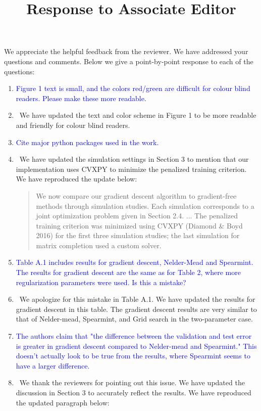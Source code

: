 \documentclass[]{article}
\title{Response to Associate Editor}
\newcommand{\point}[1]{\item \textcolor{blue}{#1}}
\newcommand{\reply}{\item[]\ }
\begin{document}
	\maketitle
		
	We appreciate the helpful feedback from the reviewer. We have addressed your questions and comments. Below we give a point-by-point response to each of the questions:
		
	\begin{enumerate}
		\point{Figure 1 text is small, and the colors red/green are difficult for colour blind readers. Please make these more readable.}
		
		\reply We have updated the text and color scheme in Figure 1 to be more readable and friendly for colour blind readers.
		
		\point {Cite major python packages used in the work.}
		
		\reply We have updated the simulation settings in Section 3 to mention that our implementation uses CVXPY to minimize the penalized training criterion. We have reproduced the update below:
		
		\begin{quote}
			We now compare our gradient descent algorithm to gradient-free methods through simulation studies. Each simulation corresponds to a joint optimization problem given in Section 2.4. ... The penalized training criterion was minimized using CVXPY (Diamond \& Boyd 2016) for the first three simulation studies; the last simulation for matrix completion used a custom solver.
		\end{quote}
			
		\point  {Table A.1 includes results for gradient descent, Nelder-Mead and Spearmint.  The results for gradient descent are the same as for Table 2, where more regularization parameters were used.  Is this a mistake?}
		
		\reply We apologize for this mistake in Table A.1. We have updated the results for gradient descent in this table. The gradient descent results are very similar to that of Nelder-mead, Spearmint, and Grid search in the two-parameter case.
			
		\point {The authors claim that "the difference between the validation and test error is greater in gradient descent compared to Nelder-mead and Spearmint." This doesn't actually look to be true from the results, where Spearmint seems to have a larger difference.}
		
		\reply We thank the reviewers for pointing out this issue. We  have updated the discussion in Section 3 to accurately reflect the results. We have reproduced the updated paragraph below:
		

\end{enumerate}
\end{document}
